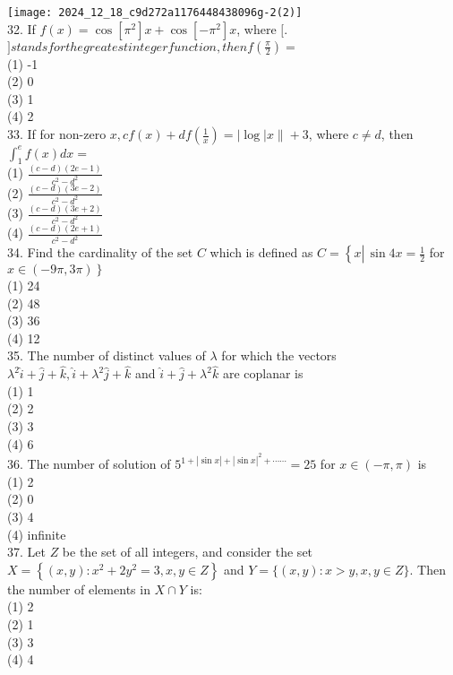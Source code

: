 \documentclass[10pt]{article}
\begin{document}
\texttt{[image: 2024\_12\_18\_c9d272a1176448438096g-2(2)]}\\
32. If $f(x)=\cos \left[\pi^{2}\right] x+\cos \left[-\pi^{2}\right] x$, where $[$.$] stands for the greatest integer function, then f\left(\frac{\pi}{2}\right)=$\\
(1) -1\\
(2) 0\\
(3) 1\\
(4) 2\\
33. If for non-zero $x, c f(x)+d f\left(\frac{1}{x}\right)=|\log | x \|+3$, where $c \neq d$, then $\int_{1}^{e} f(x) d x=$\\
(1) $\frac{(c-d)(2 e-1)}{c^{2}-d^{2}}$\\
(2) $\frac{(c-d)(3 e-2)}{c^{2}-d^{2}}$\\
(3) $\frac{(c-d)(3 e+2)}{c^{2}-d^{2}}$\\
(4) $\frac{(c-d)(2 e+1)}{c^{2}-d^{2}}$\\
34. Find the cardinality of the set $C$ which is defined as $C=\left\{x \left\lvert\, \sin 4 x=\frac{1}{2}\right.\right.$ for $\left.x \in(-9 \pi, 3 \pi)\right\}$\\
(1) 24\\
(2) 48\\
(3) 36\\
(4) 12\\
35. The number of distinct values of $\lambda$ for which the vectors $\lambda^{2} \hat{i}+\hat{j}+\hat{k}, \hat{i}+\lambda^{2} \hat{j}+\hat{k}$ and $\hat{i}+\hat{j}+\lambda^{2} \hat{k}$ are coplanar is\\
(1) 1\\
(2) 2\\
(3) 3\\
(4) 6\\
36. The number of solution of $5^{1+|\sin x|+|\sin x|^{2}+\cdots \cdots}=25$ for $x \in(-\pi, \pi)$ is\\
(1) 2\\
(2) 0\\
(3) 4\\
(4) infinite\\
37. Let $Z$ be the set of all integers, and consider the set $X=\left\{(x, y): x^{2}+2 y^{2}=3, x, y \in Z\right\}$ and $Y=\{(x, y): x>y, x, y \in Z\}$. Then the number of elements in $X \cap Y$ is:\\
(1) 2\\
(2) 1\\
(3) 3\\
(4) 4\\
\end{document}
